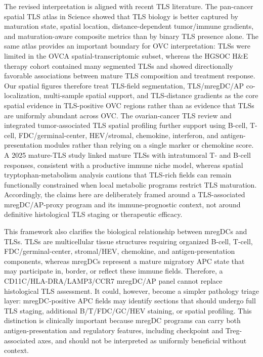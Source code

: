 \documentclass[cancers,article,submit,pdftex,moreauthors]{Definitions/mdpi}
\begin{document}
The revised interpretation is aligned with recent TLS literature. The pan-cancer spatial TLS atlas in Science showed that TLS biology is better captured by maturation state, spatial location, distance-dependent tumor/immune gradients, and maturation-aware composite metrics than by binary TLS presence alone\cite{bib118}. The same atlas provides an important boundary for OVC interpretation: TLSs were limited in the OVCA spatial-transcriptomic subset, whereas the HGSOC H\&E therapy cohort contained many segmented TLSs and showed directionally favorable associations between mature TLS composition and treatment response\cite{bib118}. Our spatial figures therefore treat TLS-field segmentation, TLS/mregDC/AP co-localization, multi-sample spatial support, and TLS-distance gradients as the core spatial evidence in TLS-positive OVC regions rather than as evidence that TLSs are uniformly abundant across OVC. The ovarian-cancer TLS review and integrated tumor-associated TLS spatial profiling further support using B-cell, T-cell, FDC/germinal-center, HEV/stromal, chemokine, interferon, and antigen-presentation modules rather than relying on a single marker or chemokine score\cite{bib119,bib122}. A 2025 mature-TLS study linked mature TLSs with intratumoral T- and B-cell responses, consistent with a productive immune niche model, whereas spatial tryptophan-metabolism analysis cautions that TLS-rich fields can remain functionally constrained when local metabolic programs restrict TLS maturation\cite{bib120,bib121}. Accordingly, the claims here are deliberately framed around a TLS-associated mregDC/AP-proxy program and its immune-prognostic context, not around definitive histological TLS staging or therapeutic efficacy.

This framework also clarifies the biological relationship between mregDCs and TLSs. TLSs are multicellular tissue structures requiring organized B-cell, T-cell, FDC/germinal-center, stromal/HEV, chemokine, and antigen-presentation components, whereas mregDCs represent a mature migratory APC state that may participate in, border, or reflect these immune fields. Therefore, a CD11C/HLA-DRA/LAMP3/CCR7 mregDC/AP panel cannot replace histological TLS assessment. It could, however, become a simpler pathology triage layer: mregDC-positive APC fields may identify sections that should undergo full TLS staging, additional B/T/FDC/GC/HEV staining, or spatial profiling. This distinction is clinically important because mregDC programs can carry both antigen-presentation and regulatory features, including checkpoint and Treg-associated axes, and should not be interpreted as uniformly beneficial without context\cite{bib75,bib99,bib104,bib110}.
\end{document}
